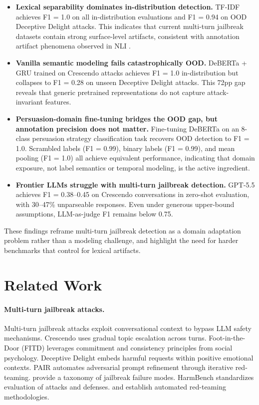 \documentclass[11pt]{article}
\begin{document}
\begin{itemize}
\item \textbf{Lexical separability dominates in-distribution detection.} TF-IDF achieves F1 = 1.0 on all in-distribution evaluations and F1 = 0.94 on OOD Deceptive Delight attacks. This indicates that current multi-turn jailbreak datasets contain strong surface-level artifacts, consistent with annotation artifact phenomena observed in NLI \citep{gururangan2018annotation,niven2019probing}.

\item \textbf{Vanilla semantic modeling fails catastrophically OOD.} DeBERTa + GRU trained on Crescendo attacks achieves F1 = 1.0 in-distribution but collapses to F1 = 0.28 on unseen Deceptive Delight attacks. This 72pp gap reveals that generic pretrained representations do not capture attack-invariant features.

\item \textbf{Persuasion-domain fine-tuning bridges the OOD gap, but annotation precision does not matter.} Fine-tuning DeBERTa on an 8-class persuasion strategy classification task recovers OOD detection to F1 = 1.0. Scrambled labels (F1 = 0.99), binary labels (F1 = 0.99), and mean pooling (F1 = 1.0) all achieve equivalent performance, indicating that domain exposure, not label semantics or temporal modeling, is the active ingredient.

\item \textbf{Frontier LLMs struggle with multi-turn jailbreak detection.} GPT-5.5 achieves F1 = 0.38--0.45 on Crescendo conversations in zero-shot evaluation, with 30--47\% unparseable responses. Even under generous upper-bound assumptions, LLM-as-judge F1 remains below 0.75.
\end{itemize}

These findings reframe multi-turn jailbreak detection as a domain adaptation problem rather than a modeling challenge, and highlight the need for harder benchmarks that control for lexical artifacts.

\section{Related Work}

\paragraph{Multi-turn jailbreak attacks.}
Multi-turn jailbreak attacks exploit conversational context to bypass LLM safety mechanisms. Crescendo \citep{russinovich2024crescendo} uses gradual topic escalation across turns. Foot-in-the-Door (FITD) \citep{jiang2024fitd} leverages commitment and consistency principles from social psychology. Deceptive Delight \citep{decdelight2024} embeds harmful requests within positive emotional contexts. PAIR \citep{chao2023pair} automates adversarial prompt refinement through iterative red-teaming. \citet{wei2024jailbroken} provide a taxonomy of jailbreak failure modes. HarmBench \citep{mazeika2024harmbench} standardizes evaluation of attacks and defenses. \citet{perez2022red} and \citet{ganguli2022red} establish automated red-teaming methodologies.
\end{document}
